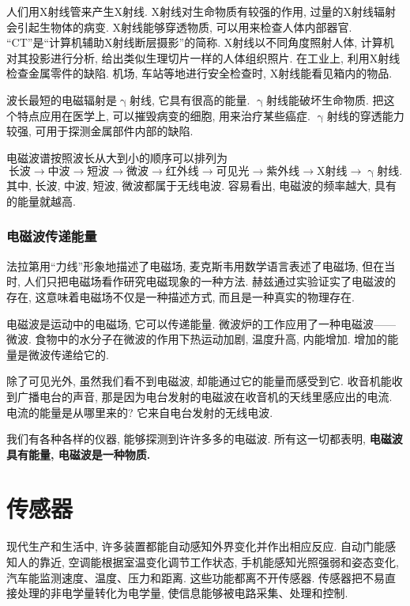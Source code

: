 \documentclass[11pt,a4paper]{ctexbook}
\begin{document}
人们用X射线管来产生X射线. X射线对生命物质有较强的作用, 过量的X射线辐射会引起生物体的病变.
X射线能够穿透物质, 可以用来检查人体内部器官. ``CT''是``计算机辅助X射线断层摄影''的简称.
X射线以不同角度照射人体, 计算机对其投影进行分析, 给出类似生理切片一样的人体组织照片.
在工业上, 利用X射线检查金属零件的缺陷. 机场, 车站等地进行安全检查时, X射线能看见箱内的物品.

波长最短的电磁辐射是$\upgamma$射线, 它具有很高的能量.
$\upgamma$射线能破坏生命物质. 把这个特点应用在医学上, 可以摧毁病变的细胞, 用来治疗某些癌症.
$\upgamma$射线的穿透能力较强, 可用于探测金属部件内部的缺陷.

电磁波谱按照波长从大到小的顺序可以排列为
$$\text{长波}\rightarrow\text{中波}\rightarrow\text{短波}\rightarrow\text{微波}\rightarrow\text{红外线}\rightarrow\text{可见光}\rightarrow\text{紫外线}\rightarrow\text{X射线}\rightarrow\upgamma \text{射线}.$$
其中, 长波, 中波, 短波, 微波都属于无线电波. 容易看出, 电磁波的频率越大, 具有的能量就越高.

\subsection{电磁波传递能量}

法拉第用``力线''形象地描述了电磁场, 麦克斯韦用数学语言表述了电磁场, 但在当时,
人们只把电磁场看作研究电磁现象的一种方法. 赫兹通过实验证实了电磁波的存在,
这意味着电磁场不仅是一种描述方式, 而且是一种真实的物理存在.

电磁波是运动中的电磁场, 它可以传递能量. 微波炉的工作应用了一种电磁波——微波.
食物中的水分子在微波的作用下热运动加剧, 温度升高, 内能增加.
增加的能量是微波传递给它的.

除了可见光外, 虽然我们看不到电磁波, 却能通过它的能量而感受到它.
收音机能收到广播电台的声音, 那是因为电台发射的电磁波在收音机的天线里感应出的电流.
电流的能量是从哪里来的? 它来自电台发射的无线电波.

我们有各种各样的仪器, 能够探测到许许多多的电磁波.
所有这一切都表明, \textbf{电磁波具有能量, 电磁波是一种物质.}


\chapter{传感器}

现代生产和生活中, 许多装置都能自动感知外界变化并作出相应反应. 自动门能感知人的靠近,
空调能根据室温变化调节工作状态, 手机能感知光照强弱和姿态变化, 汽车能监测速度、温度、压力和距离.
这些功能都离不开传感器. 传感器把不易直接处理的非电学量转化为电学量, 使信息能够被电路采集、处理和控制.
\end{document}

